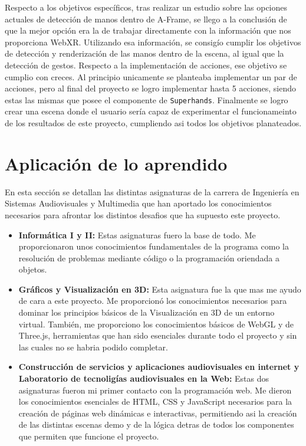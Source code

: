 \documentclass[a4paper, 12pt]{book}
\begin{document}
Respecto a los objetivos específicos, tras realizar un estudio sobre las opciones actuales de detección de manos dentro de A-Frame, se llego a la conclusión de que la mejor opción era la de trabajar directamente con la información que nos proporciona WebXR. 
Utilizando esa información, se consigío cumplir los objetivos de detección y renderización de las manos dentro de la escena, al igual que la detección de gestos. 
Respecto a la implementación de acciones, ese objetivo se cumplio con creces. Al principio unicamente se planteaba implementar un par de acciones, pero al final del proyecto se logro implementar hasta 5 acciones, siendo estas las mismas que posee el componente de \texttt{Superhands}.
Finalmente se logro crear una escena donde el usuario sería capaz de experimentar el funcionameinto de los resultados de este proyecto, cumpliendo asi todos los objetivos planateados. 

\section{Aplicación de lo aprendido}
\label{sec:aplicacion}

En esta sección se detallan las distintas asignaturas de la carrera de Ingeniería en Sistemas Audiovisuales y Multimedia que han aportado los conocimientos necesarios para afrontar los distintos desafios que ha supuesto este proyecto. 

\begin{itemize}
  \item \textbf{Informática I y II:} Estas asignaturas fuero la base de todo. Me proporcionaron unos conocimientos fundamentales de la programa como la resolución de problemas mediante código o la programación oriendada a objetos.
  \item \textbf{Gráficos y Visualización en 3D:} Esta asignatura fue la que mas me ayudo de cara a este proyecto. Me proporcionó los conocimientos necesarios para dominar los principios básicos de la Visualización en 3D de un entorno virtual. También, me proporciono los conocimientos básicos de WebGL y de Three.js, herramientas que han sido esenciales durante todo el proyecto y sin las cuales no se habria podido completar. 
  \item \textbf{Construcción de servicios y aplicaciones audiovisuales en internet y Laboratorio de tecnoligías audiovisuales en la Web:} Estas dos asignaturas fueron mi primer contacto con la programación web. Me dieron los conocimientos esenciales de HTML, CSS y JavaScript necesarios para la creación de páginas web dinámicas e interactivas, permitiendo asi la creación de las distintas escenas demo y de la lógica detras de todos los componentes que permiten que funcione el proyecto.
\end{itemize}
\end{document}
